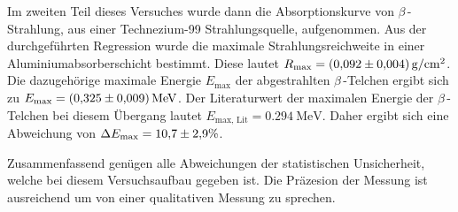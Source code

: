 Im zweiten Teil dieses Versuches wurde dann die Absorptionskurve von $\beta$\,-Strahlung, aus einer Technezium-99 Strahlungsquelle, aufgenommen. Aus der durchgeführten 
Regression wurde die maximale Strahlungsreichweite in einer Aluminiumabsorberschicht bestimmt. Diese lautet $R_\text{max} = \qty{0.092 +- 0.004}{\gram\per\centi\metre\squared}$. 
Die dazugehörige maximale Energie $E_\text{max}$ der abgestrahlten $\beta$\,-Telchen ergibt sich zu $E_\text{max} = \qty{0.325 +- 0.009}{\mega\electronvolt}$. Der Literaturwert
der maximalen Energie der $\beta$\,-Telchen bei diesem Übergang lautet $E_{\text{max, Lit}} = \qty{0.294}{\mega\electronvolt}$. Daher ergibt sich eine Abweichung von
$\Delta E_\text{max} = \num{10.7 +- 2.9}\%$. 

Zusammenfassend genügen alle Abweichungen der statistischen Unsicherheit, welche bei diesem Versuchsaufbau gegeben ist. Die Präzesion der Messung ist ausreichend um 
von einer qualitativen Messung zu sprechen.
